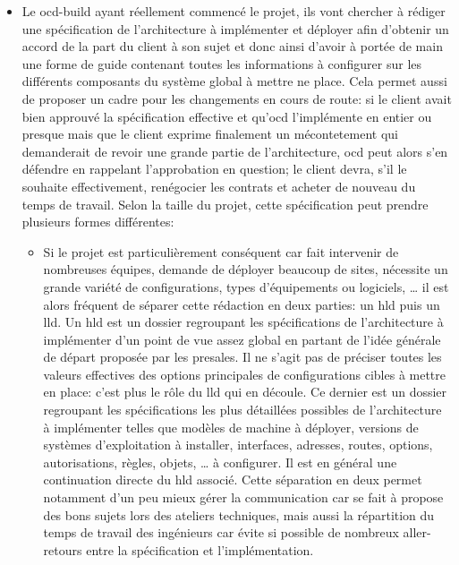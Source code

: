 \documentclass[12pt, oneside, a4paper, titlepage]{report}
\begin{document}
\begin{itemize}
    \item Le \gls{ocd-build} ayant réellement commencé le projet, ils vont
        chercher à rédiger une spécification de l'architecture à implémenter et
        déployer afin d'obtenir un accord de la part du client à son sujet et
        donc ainsi d'avoir à portée de main une forme de guide contenant toutes
        les informations à configurer sur les différents composants du système
        global à mettre ne place. Cela permet aussi de proposer un cadre pour
        les changements en cours de route: si le client avait bien approuvé la
        spécification effective et qu'\acrlong{ocd} l'implémente en entier ou
        presque mais que le client exprime finalement un mécontetement qui
        demanderait de revoir une grande partie de l'architecture, \gls{ocd}
        peut alors s'en défendre en rappelant l'approbation en question; le
        client devra, s'il le souhaite effectivement, renégocier les contrats et
        acheter de nouveau du temps de travail. Selon la taille du projet, cette
        spécification peut prendre plusieurs formes différentes:

    \begin{itemize}

        \item Si le projet est particulièrement conséquent car fait intervenir
            de nombreuses équipes, demande de déployer beaucoup de sites,
            nécessite un grande variété de configurations, types d'équipements
            ou logiciels, \ldots{} il est alors fréquent de séparer cette
            rédaction en deux parties: un \gls{hld} puis un \gls{lld}. Un
            \gls{hld} est un dossier regroupant les spécifications de
            l'architecture à implémenter d'un point de vue assez global en
            partant de l'idée générale de départ proposée par les
            \gls{presales}. Il ne s'agit pas de préciser toutes les valeurs
            effectives des options principales de configurations cibles à mettre
            en place: c'est plus le rôle du \gls{lld} qui en découle. Ce dernier
            est un dossier regroupant les spécifications les plus détaillées
            possibles de l'architecture à implémenter telles que modèles de
            machine à déployer, versions de systèmes d'exploitation à installer,
            interfaces, adresses, routes, options, autorisations, règles,
            objets, \ldots{} à configurer. Il est en général une continuation
            directe du \gls{hld} associé. Cette séparation en deux permet
            notamment d'un peu mieux gérer la communication car se fait à
            propose des bons sujets lors des ateliers techniques, mais aussi la
            répartition du temps de travail des ingénieurs car évite si possible
            de nombreux aller-retours entre la spécification et
            l'implémentation.


\end{itemize}
\end{itemize}
\end{document}
